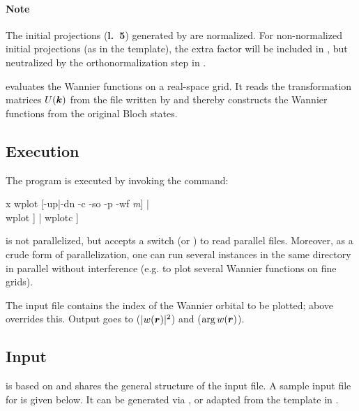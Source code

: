 \paragraph{Note} The initial projections (\textbf{l.~5}) generated by
\writeinwf are normalized.  For non-normalized initial projections (as
in the template), the extra factor will be included in
, but neutralized by the orthonormalization step in
\wannier.



\wplot evaluates the Wannier functions on a real-space grid.  It reads
the transformation matrices $U(\boldsymbol k)$ from the file 
written by \wannierx and thereby constructs the Wannier functions from
the original \wien Bloch states.

\subsection{Execution}

The program \wplot is executed by invoking the command:
%
\begin{usage}
  x wplot [-up|-dn -c -so -p -wf \textit{m}]   |
  \\
  wplot  \deffile [\textit{m} [\#proc]] |
  wplotc \deffile [\textit{m} [\#proc]]
\end{usage}
%
\wplot is not parallelized, but accepts a  switch (or
) to read parallel  files.  Moreover, as a
crude form of parallelization, one can run several \wplot instances in
the same directory in parallel without interference (e.g. to plot
several Wannier functions on fine grids).

The input file contains the index of the Wannier orbital to be
plotted;  above overrides this.  Output goes to
 ($|w(\boldsymbol r)|^2$) and
 ($\arg w(\boldsymbol r)$).

\subsection{Input}

\wplot is based on  and shares the general structure of
the input file.  A sample input file for  is given below.
It can be generated via \writeinwplot, or adapted from the template in
.
%
%

